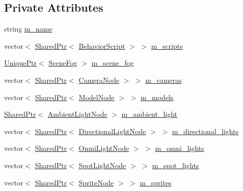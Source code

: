 \subsection*{Private Attributes}
\begin{DoxyCompactItemize}
\item 
string \hyperlink{classmage_1_1_scene_a6cc8cb08b1853c4e3063b33a94e8fb47}{m\+\_\+name}
\item 
vector$<$ \hyperlink{namespacemage_a1e01ae66713838a7a67d30e44c67703e}{Shared\+Ptr}$<$ \hyperlink{classmage_1_1_behavior_script}{Behavior\+Script} $>$ $>$ \hyperlink{classmage_1_1_scene_a84548bf6978f8955ce5892cb23536a4e}{m\+\_\+scripts}
\item 
\hyperlink{namespacemage_a3316d7143a973e37adf1110f2e80ca31}{Unique\+Ptr}$<$ \hyperlink{structmage_1_1_scene_fog}{Scene\+Fog} $>$ \hyperlink{classmage_1_1_scene_a58f8d29322664c4c5895703a6cbc9000}{m\+\_\+scene\+\_\+fog}
\item 
vector$<$ \hyperlink{namespacemage_a1e01ae66713838a7a67d30e44c67703e}{Shared\+Ptr}$<$ \hyperlink{classmage_1_1_camera_node}{Camera\+Node} $>$ $>$ \hyperlink{classmage_1_1_scene_a76fc089ae3185c82702d2ca42fd820e7}{m\+\_\+cameras}
\item 
vector$<$ \hyperlink{namespacemage_a1e01ae66713838a7a67d30e44c67703e}{Shared\+Ptr}$<$ \hyperlink{classmage_1_1_model_node}{Model\+Node} $>$ $>$ \hyperlink{classmage_1_1_scene_a01132a667fbc1517f11ae561bc221071}{m\+\_\+models}
\item 
\hyperlink{namespacemage_a1e01ae66713838a7a67d30e44c67703e}{Shared\+Ptr}$<$ \hyperlink{namespacemage_ab0783a7428706251f8561dc30a4d228d}{Ambient\+Light\+Node} $>$ \hyperlink{classmage_1_1_scene_a0ce9718f4b0137a52b858a29d3504328}{m\+\_\+ambient\+\_\+light}
\item 
vector$<$ \hyperlink{namespacemage_a1e01ae66713838a7a67d30e44c67703e}{Shared\+Ptr}$<$ \hyperlink{namespacemage_a7637b5351fc0f66a10badd80ebb35899}{Directional\+Light\+Node} $>$ $>$ \hyperlink{classmage_1_1_scene_a895f2ae809c17be09072f6bb89fd4e9c}{m\+\_\+directional\+\_\+lights}
\item 
vector$<$ \hyperlink{namespacemage_a1e01ae66713838a7a67d30e44c67703e}{Shared\+Ptr}$<$ \hyperlink{namespacemage_a1724c6e6b6b5ba535cdd967cbbb4a669}{Omni\+Light\+Node} $>$ $>$ \hyperlink{classmage_1_1_scene_a881c3dd7e85e5069650f29fd2722bf78}{m\+\_\+omni\+\_\+lights}
\item 
vector$<$ \hyperlink{namespacemage_a1e01ae66713838a7a67d30e44c67703e}{Shared\+Ptr}$<$ \hyperlink{namespacemage_aeed5dee4ff6c591eabb0e9114256df4a}{Spot\+Light\+Node} $>$ $>$ \hyperlink{classmage_1_1_scene_a4e1954bc0b812d6a71123ca3ac9eeb75}{m\+\_\+spot\+\_\+lights}
\item 
vector$<$ \hyperlink{namespacemage_a1e01ae66713838a7a67d30e44c67703e}{Shared\+Ptr}$<$ \hyperlink{classmage_1_1_sprite_node}{Sprite\+Node} $>$ $>$ \hyperlink{classmage_1_1_scene_a2d68edf08b57dde36ec7cf1f5a91d281}{m\+\_\+sprites}
\end{DoxyCompactItemize}



